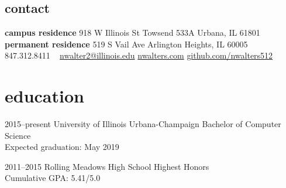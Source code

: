 \documentclass[print,nofooter]{resume}
\begin{document}


\begin{aside} %
\section{contact}\vspace{0.25cm}
\textbf{campus residence}
918 W Illinois St
Towsend 533A
Urbana, IL
61801
~
\textbf{permanent residence}
519 S Vail Ave
Arlington Heights, IL
60005
~
847.312.8411
~
\href{mailto:nwalter2@illinois.edu}{nwalter2@illinois.edu}
\href{http://www.nwalters.com}{nwalters.com}
\href{http://github.com/nwalters512}{github.com/nwalters512}
\end{aside}





\section{education}

\begin{entrylist}


\entry
{2015--present}
{University of Illinois Urbana-Champaign}
{}
{Bachelor of Computer Science \\
Expected graduation: May 2019}


\entry
{2011--2015}
{Rolling Meadows High School}
{}
{Highest Honors \\
Cumulative GPA: 5.41/5.0}


\end{entrylist}
\end{document}
